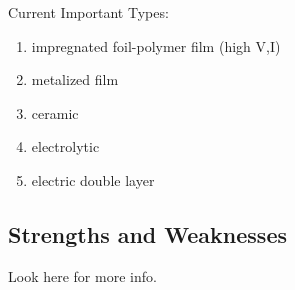 Current Important Types: \cite{deis_hist}
\begin{enumerate}
    \item impregnated foil-polymer film (high V,I)
    \item metalized film
    \item ceramic
    \item electrolytic
    \item electric double layer
\end{enumerate}

\subsection{Strengths and Weaknesses}
Look here for more info. \cite{deis_hist}
